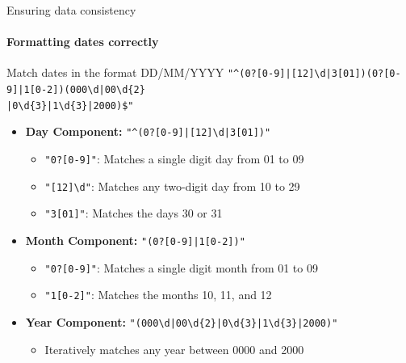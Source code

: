 \documentclass[]{beamer}
\begin{document}
\begin{frame}[fragile]{Ensuring data consistency}
	\framesubtitle{Formatting dates correctly}

	\begin{exampleblock}{\small Match dates in the format DD/MM/YYYY}
		\small\texttt{"\textasciicircum(0?[0-9]|[12]\textbackslash d|3[01])\/(0?[0-9]|1[0-2])\/(000\textbackslash d|00\textbackslash d\{2\}\\|0\textbackslash d\{3\}|1\textbackslash d\{3\}|2000)\$"}
	\end{exampleblock}

	\begin{itemize}
		\item \small \textbf{Day Component:} \texttt{"\textasciicircum(0?[0-9]|[12]\textbackslash d|3[01])"}
		\begin{itemize}
		  \item \texttt{"0?[0-9]"}: Matches a single digit day from 01 to 09
		  \item \texttt{"[12]\textbackslash d"}: Matches any two-digit day from 10 to 29
		  \item \texttt{"3[01]"}: Matches the days 30 or 31
		\end{itemize}
	  
		\item \small \textbf{Month Component:} \texttt{"(0?[0-9]|1[0-2])"}
		\begin{itemize}
		  \item \texttt{"0?[0-9]"}: Matches a single digit month from 01 to 09
		  \item \texttt{"1[0-2]"}: Matches the months 10, 11, and 12
		\end{itemize}
	  
		\item \small \textbf{Year Component:} \texttt{"(000\textbackslash d|00\textbackslash d\{2\}|0\textbackslash d\{3\}|1\textbackslash d\{3\}|2000)"}
		\begin{itemize}
		  \item Iteratively matches any year between 0000 and 2000
		\end{itemize}
	\end{itemize}
\end{frame}
\end{document}
